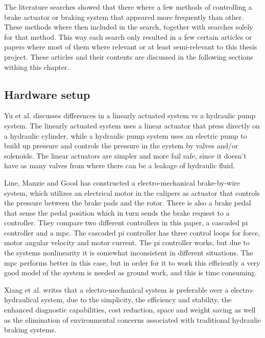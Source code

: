 \documentclass[a4paper,11pt]{kth-mag}
\begin{document}
The literature searches showed that there where a few methods of controlling a brake actuator or braking system that appeared more frequently than other. These methods where then included in the search, together with searches solely for that method. This way each search only resulted in a few certain articles or papers where most of them where relevant or at least semi-relevant to this thesis project. These articles and their contents are discussed in the following sections withing this chapter.


\subsection{Hardware setup}
Yu et al. \cite{Yu} discusses differences in a linearly actuated system vs a hydraulic pump system. The linearly actuated system uses a linear actuator that press directly on a hydraulic cylinder, while a hydraulic pump system uses an electric pump to build up pressure and controls the pressure in the system by valves and/or solenoids. The linear actuators are simpler and more fail safe, since it doesn't have as many valves from where there can be a leakage of hydraulic fluid. 


\vspace{5mm}
Line, Manzie and Good \cite{4475522} has constructed a electro-mechanical  brake-by-wire system, which utilizes an electrical motor in the calipers as actuator that controls the pressure between the brake pads and the rotor. There is also a brake pedal that sense the pedal position which in turn sends the brake request to a controller. They compare two different controllers in this paper, a cascaded \gls{pi} controller and a \gls{mpc}. The cascaded \gls{pi} controller has three control loops for force, motor angular velocity and motor current. The \gls{pi} controller works, but due to the systems nonlinearity it is somewhat inconsistent in different situations. The \gls{mpc} performs better in this case, but in order for it to work this efficiently a very good model of the system is needed as ground work, and this is time consuming. \newline


Xiang et al. \cite{Xiang} writes that a electro-mechanical system is preferable over a electro-hydraulical system, due to the simplicity, the efficiency and stability, the enhanced diagnostic capabilities, cost reduction, space and weight saving as well as the elimination of environmental concerns associated with traditional hydraulic braking systems.\newline
\end{document}
